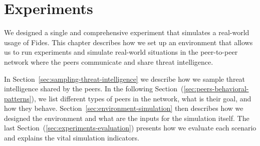 \chapter{Experiments}
\label{ch:experiments}
We designed a single and comprehensive experiment that simulates a real-world usage of Fides. This chapter describes how we set up an environment that allows us to run experiments and simulate real-world situations in the peer-to-peer network where the peers communicate and share threat intelligence.

In Section~\ref{sec:sampling-threat-intelligence} we describe how we sample threat intelligence shared by the peers.
In the following Section~(\ref{sec:peers-behavioral-patterns}), we list different types of peers in the network, what is their goal, and how they behave.
Section~\ref{sec:environment-simulation} then describes how we designed the environment and what are the inputs for the simulation itself.
The last Section~(\ref{sec:experiments-evaluation}) presents how we evaluate each scenario and explains the vital simulation indicators.







